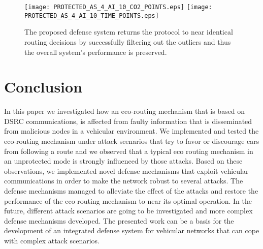 \documentclass[conference]{IEEEtran}
\begin{document}
\begin{figure}[!htb]
  \centering
     \texttt{[image: PROTECTED\_AS\_4\_AI\_10\_CO2\_POINTS.eps]}
    \texttt{[image: PROTECTED\_AS\_4\_AI\_10\_TIME\_POINTS.eps]}
  \caption{The proposed defense system  returns the protocol to near identical routing decisions by successfully filtering out the outliers and thus the overall system's performance is  preserved. }
  \label{impact-of-defense}
\end{figure}



\section{Conclusion}
In this paper we investigated how an eco-routing mechanism that is based on DSRC communications, 
is affected from faulty information that is  disseminated from malicious nodes in a vehicular environment. 
We implemented and tested the eco-routing mechanism
under attack scenarios that try to favor or discourage cars from following a route and we observed that a typical 
eco routing mechanism in an unprotected mode is strongly influenced by those attacks.
Based on these observations, we implemented novel defense mechanisms that exploit vehicular 
communications in order to make the network robust to several attacks. The defense mechanisms managed to alleviate
the effect of the attacks and restore the performance of the eco routing mechanism to near its optimal operation.
In the future, different attack scenarios are going to be investigated and more complex defense mechanisms developed.
The presented work can be a basis for the development of an integrated defense system for vehicular networks that 
can cope with  complex attack scenarios.




\end{document}
